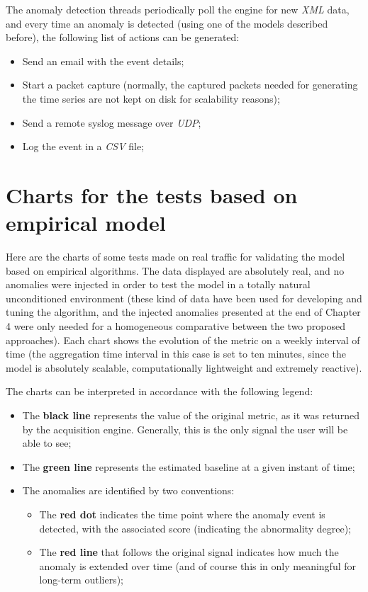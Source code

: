 \documentclass[12pt,a4paper,cucitura]{toptesi}
\begin{document}
The anomaly detection threads periodically poll the engine for new \emph{XML} data, and every time an anomaly is detected (using one of the models described before), the following list of actions can be generated:

\begin{itemize}
\item Send an email with the event details;
\item Start a packet capture (normally, the captured packets needed for generating the time series are not kept on disk for scalability reasons);
\item Send a remote syslog message over \emph{UDP};
\item Log the event in a \emph{CSV} file;
\end{itemize}

\appendix

\chapter{Charts for the tests based on empirical model}

Here are the charts of some tests made on real traffic for validating the model based on empirical algorithms.
The data displayed are absolutely real, and no anomalies were injected in order to test the model in a totally natural unconditioned environment (these kind of data have been used for developing and tuning the algorithm, and the injected anomalies presented at the end of Chapter 4 were only needed for a homogeneous comparative between the two proposed approaches). 
Each chart shows the evolution of the metric on a weekly interval of time (the aggregation time interval in this case is set to ten minutes, since the model is absolutely scalable, computationally lightweight and extremely reactive).

The charts can be interpreted in accordance with the following legend:

\begin{itemize}
\item The \textbf{black line} represents the value of the original metric, as it was returned by the acquisition engine. Generally, this is the only signal the user will be able to see;
\item The \textbf{green line} represents the estimated baseline at a given instant of time;
\item The anomalies are identified by two conventions:
\begin{itemize}
\item The \textbf{red dot} indicates the time point where the anomaly event is detected, with the associated score (indicating the abnormality degree);
\item The \textbf{red line} that follows the original signal indicates how much the anomaly is extended over time (and of course this in only meaningful for long-term outliers);
\end{itemize}
\end{itemize}
\end{document}
